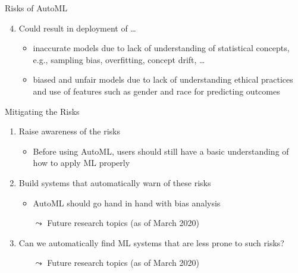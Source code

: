 \begin{frame}[c]{Risks of AutoML}

\begin{enumerate}\setcounter{enumi}{3}
	\item Could result in deployment of \ldots
	\pause
	\begin{itemize}
		\item \alert{inaccurate models} due to lack of understanding of statistical concepts, e.g., sampling bias, overfitting, concept drift, \ldots
		\pause
		\medskip
		\item \alert{biased and unfair models} due to lack of understanding ethical practices and use of features such as gender and race for predicting outcomes
	\end{itemize}
\end{enumerate}

\end{frame}
\begin{frame}[c]{Mitigating the Risks}

\begin{enumerate}
	\item Raise awareness of the risks
	\begin{itemize}
		\item Before using AutoML, users should still have a basic understanding of\\ how to apply ML properly
	\end{itemize}
	\pause
	\bigskip
	\item Build systems that automatically warn of these risks
	\begin{itemize}
		\item AutoML should go hand in hand with bias analysis 
		\item[$\leadsto$] Future research topics (as of March 2020)
	\end{itemize}
	\pause
	\bigskip
	\item Can we automatically find ML systems that are less prone to such risks?
	\begin{itemize}
		\item[$\leadsto$] Future research topics (as of March 2020)
	\end{itemize}
	
\end{enumerate}



\end{frame}


